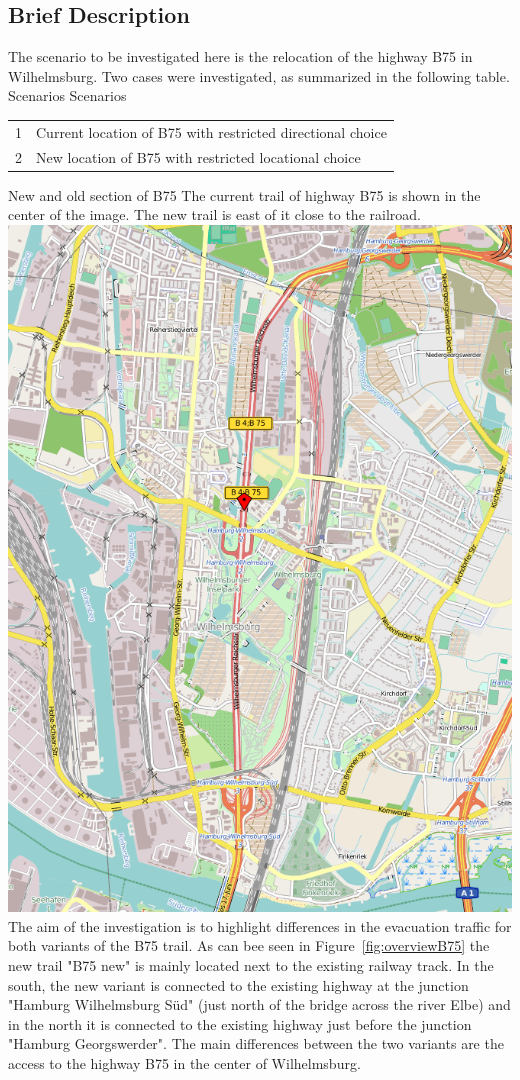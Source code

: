 \subsection{Brief Description}
The scenario to be investigated here is the relocation of the highway B75 in Wilhelmsburg. Two cases were investigated, as summarized in the following table.
%
\createtable%
	{Scenarios}%
	{Scenarios}%
	{\label{table:b75scenarios}}%
	{%
	\begin{tabular}{|l | l|}
	\hline
	1 & Current location of B75 with restricted directional choice\\
	2 & New location of B75 with restricted locational choice\\
	\hline
\end{tabular}
}%
{}%
%
\createfigure%
	{New and old section of B75}%
	{The current trail of highway B75 is shown in the center of the image. The new trail is east of it close to the railroad.}%
	{\label{fig:overviewB75}}%
	{\includegraphics[width=0.7\linewidth]{using/figures/B75overview}}%
{}
%
The aim of the investigation is to highlight differences in the evacuation traffic for both variants of the B75 trail. As can bee seen in Figure~\ref{fig:overviewB75} the new trail "B75 new" is mainly located next to the existing railway track. In the south, the new variant is connected to the existing highway at the junction "Hamburg Wilhelmsburg Süd" (just north of the bridge across the river Elbe) and in the north it is connected to the existing highway just before the junction "Hamburg Georgswerder". The main differences between the two variants are the access to the highway B75 in the center of Wilhelmsburg.

